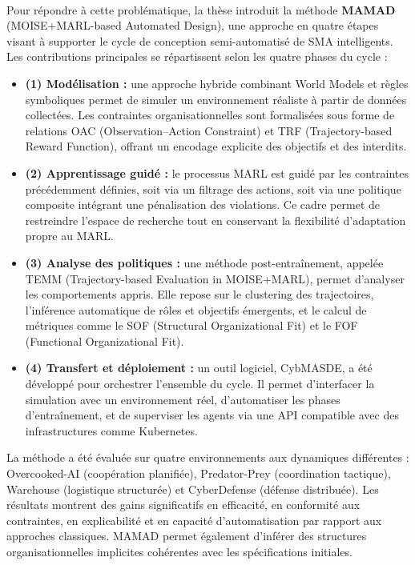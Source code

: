 \bigskip

\\

\noindent
Pour répondre à cette problématique, la thèse introduit la méthode \textbf{MAMAD} (MOISE+MARL-based Automated Design), une approche en quatre étapes visant à supporter le cycle de conception semi-automatisé de SMA intelligents. Les contributions principales se répartissent selon les quatre phases du cycle :

\begin{itemize}
    \item \textbf{(1) Modélisation :} une approche hybride combinant World Models et règles symboliques permet de simuler un environnement réaliste à partir de données collectées. Les contraintes organisationnelles sont formalisées sous forme de relations OAC (Observation–Action Constraint) et TRF (Trajectory-based Reward Function), offrant un encodage explicite des objectifs et des interdits.

    \item \textbf{(2) Apprentissage guidé :} le processus MARL est guidé par les contraintes précédemment définies, soit via un filtrage des actions, soit via une politique composite intégrant une pénalisation des violations. Ce cadre permet de restreindre l’espace de recherche tout en conservant la flexibilité d’adaptation propre au MARL.

    \item \textbf{(3) Analyse des politiques :} une méthode post-entraînement, appelée TEMM (Trajectory-based Evaluation in MOISE+MARL), permet d’analyser les comportements appris. Elle repose sur le clustering des trajectoires, l’inférence automatique de rôles et objectifs émergents, et le calcul de métriques comme le SOF (Structural Organizational Fit) et le FOF (Functional Organizational Fit).

    \item \textbf{(4) Transfert et déploiement :} un outil logiciel, CybMASDE, a été développé pour orchestrer l’ensemble du cycle. Il permet d’interfacer la simulation avec un environnement réel, d’automatiser les phases d’entraînement, et de superviser les agents via une API compatible avec des infrastructures comme Kubernetes.
\end{itemize}

La méthode a été évaluée sur quatre environnements aux dynamiques différentes : Overcooked-AI (coopération planifiée), Predator-Prey (coordination tactique), Warehouse (logistique structurée) et CyberDefense (défense distribuée). Les résultats montrent des gains significatifs en efficacité, en conformité aux contraintes, en explicabilité et en capacité d’automatisation par rapport aux approches classiques. MAMAD permet également d’inférer des structures organisationnelles implicites cohérentes avec les spécifications initiales.

